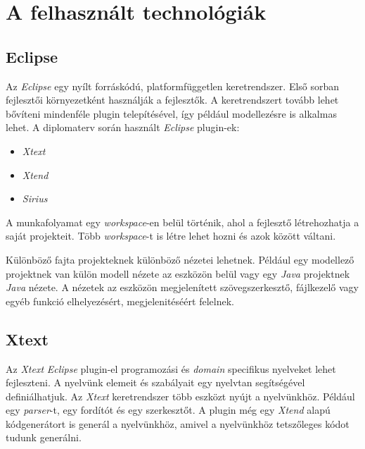 \clearpage\section{A felhasznált technológiák}
\subsection{Eclipse}

Az \textit{Eclipse} egy nyílt forráskódú, platformfüggetlen keretrendszer.
Első sorban fejlesztői környezetként használják a fejlesztők.
A keretrendszert tovább lehet bővíteni mindenféle plugin telepítésével, így például modellezésre is alkalmas lehet.
A diplomaterv során használt \textit{Eclipse} plugin-ek:

\begin{itemize}
    \item \textit{Xtext}
    \item \textit{Xtend}
    \item \textit{Sirius}
\end{itemize}

A munkafolyamat egy \textit{workspace}-en belül történik, ahol a fejlesztő létrehozhatja a saját projekteit.
Több \textit{workspace}-t is létre lehet hozni és azok között váltani.

Különböző fajta projekteknek különböző nézetei lehetnek.
Például egy modellező projektnek van külön modell nézete az eszközön belül vagy egy \textit{Java} projektnek \textit{Java} nézete.
A nézetek az eszközön megjelenített szövegszerkesztő, fájlkezelő vagy egyéb funkció elhelyezésért, megjelenitéséért felelnek.

\subsection{Xtext}

Az \textit{Xtext} \textit{Eclipse} plugin-el programozási és \textit{domain} specifikus nyelveket lehet fejleszteni.
A nyelvünk elemeit és szabályait egy nyelvtan segítségével definiálhatjuk.
Az \textit{Xtext} keretrendszer több eszközt nyújt a nyelvünkhöz.
Például egy \textit{parser}-t, egy fordítót és egy szerkesztőt.
A plugin még egy \textit{Xtend} alapú kódgenerátort is generál a nyelvünkhöz, amivel a nyelvünkhöz tetszőleges kódot tudunk generálni.

